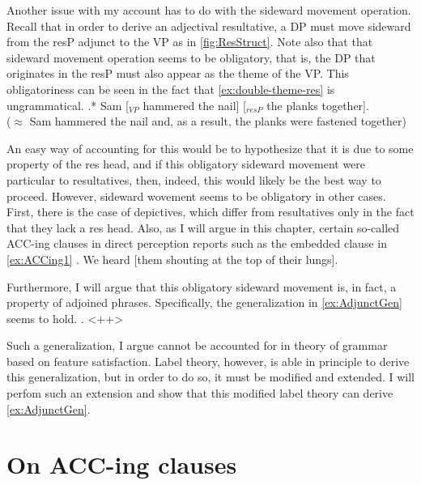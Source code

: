 \documentclass[MilwayThesis]{subfiles}
\begin{document}
Another issue with my account has to do with the sideward movement operation.
Recall that in order to derive an adjectival resultative, a DP must move sideward from the resP adjunct to the VP as in \cref{fig:ResStruct}.
Note also that that sideward movement operation seems to be obligatory, that is, the DP that originates in the resP must also appear as the theme of the VP.
This obligatoriness can be seen in the fact that \cref{ex:double-theme-res} is ungrammatical.
\ex.*  Sam [$_{VP}$ hammered the nail] [$_{resP}$ the planks together].\label{ex:double-theme-res}\\
($\approx$ Sam hammered the nail and, as a result, the planks were fastened together)

An easy way of accounting for this would be to hypothesize that it is due to some property of the res head, and if this obligatory sideward movement were particular to resultatives, then, indeed, this would likely be the best way to proceed.
However, sideward wovement seems to be obligatory in other cases.
First, there is the case of depictives, which differ from resultatives only in the fact that they lack a res head.
Also, as I will argue in this chapter, certain so-called ACC-ing clauses in direct perception reports such as the embedded clause in \cref{ex:ACCing1} 
\ex. We heard [them shouting at the top of their lungs].\label{ex:ACCing1}

Furthermore, I will argue that this obligatory sideward movement is, in fact, a property of adjoined phrases.
Specifically, the generalization in \cref{ex:AdjunctGen} seems to hold.
\ex. <++>\label{ex:AdjunctGen}

Such a generalization, I argue cannot be accounted for in theory of grammar based on feature satisfaction.
Label theory, however, is able in principle to derive this generalization, but in order to do so, it must be modified and extended.
I will perfom such an extension and show that this modified label theory can derive \cref{ex:AdjunctGen}.

\section{On ACC-ing clauses}
\end{document}
